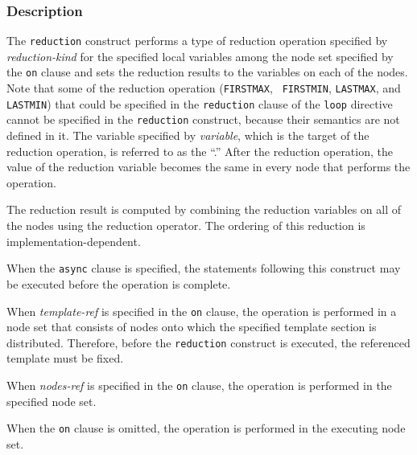 \subsubsection*{Description}

The {\tt reduction} construct performs a type of
reduction operation specified by {\it reduction-kind} for the specified
local variables among the node set specified by the {\tt on}
clause and sets the reduction results to the variables on each of the
nodes.
%
Note that some of the reduction operation ({\tt FIRSTMAX}, {\tt
FIRSTMIN}, {\tt LASTMAX}, and {\tt LASTMIN}) that could be specified in
the {\tt reduction} clause of the {\tt loop} directive cannot be
specified in the {\tt reduction} construct, because their semantics are
not defined in it.
%
The variable specified by {\it variable}, which is the target of the
reduction operation, is referred to as the ``.'' After the reduction operation, the value of the
reduction variable becomes the same in every node that performs the
operation.

The reduction result is computed by combining the reduction variables on
all of the nodes using the reduction operator. The ordering of this
reduction is implementation-dependent.

When the {\tt async} clause is specified, the statements following this
construct may be executed before the operation is complete.

When {\it template-ref} is specified in the {\tt on} clause, the operation
is performed in a node set that consists of nodes onto which the
specified template section is distributed.
Therefore, before the {\tt reduction} construct is executed, the
referenced template must be fixed.
%
%

When {\it nodes-ref} is specified in the {\tt on} clause, the operation
is performed in the specified node set.

When the {\tt on} clause is omitted, the operation is performed in the
executing node set.

